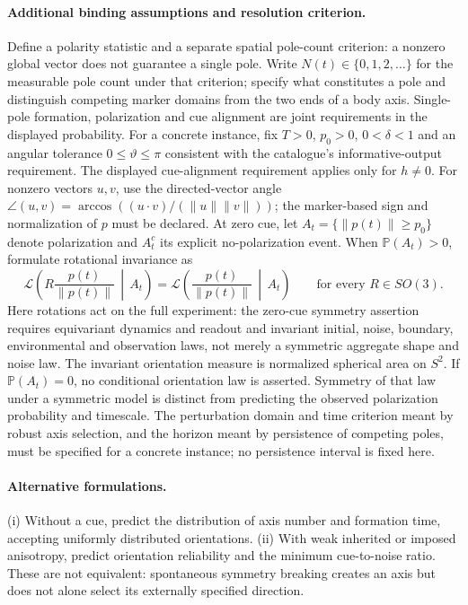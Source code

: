 \documentclass[11pt]{article}
\begin{document}
\paragraph{Additional binding assumptions and resolution criterion.} Define a polarity statistic and a separate spatial pole-count criterion: a nonzero global vector does not guarantee a single pole. Write $N(t)\in\{0,1,2,\ldots\}$ for the measurable pole count under that criterion; specify what constitutes a pole and distinguish competing marker domains from the two ends of a body axis. Single-pole formation, polarization and cue alignment are joint requirements in the displayed probability. For a concrete instance, fix $T>0$, $p_0>0$, $0<\delta<1$ and an angular tolerance $0\leq\vartheta\leq\pi$ consistent with the catalogue's informative-output requirement. The displayed cue-alignment requirement applies only for $h\ne0$. For nonzero vectors $u,v$, use the directed-vector angle $\angle(u,v)=\arccos((u\cdot v)/(\|u\|\|v\|))$; the marker-based sign and normalization of $p$ must be declared. At zero cue, let $A_t=\{\|p(t)\|\geq p_0\}$ denote polarization and $A_t^c$ its explicit no-polarization event. When $\mathbb{P}(A_t)>0$, formulate rotational invariance as
\[
\mathcal{L}\!\left(R\frac{p(t)}{\|p(t)\|}\,\middle|\,A_t\right)
=\mathcal{L}\!\left(\frac{p(t)}{\|p(t)\|}\,\middle|\,A_t\right)
\qquad\text{for every }R\in SO(3).
\]
Here rotations act on the full experiment: the zero-cue symmetry assertion requires equivariant dynamics and readout and invariant initial, noise, boundary, environmental and observation laws, not merely a symmetric aggregate shape and noise law. The invariant orientation measure is normalized spherical area on $S^2$. If $\mathbb{P}(A_t)=0$, no conditional orientation law is asserted. Symmetry of that law under a symmetric model is distinct from predicting the observed polarization probability and timescale. The perturbation domain and time criterion meant by robust axis selection, and the horizon meant by persistence of competing poles, must be specified for a concrete instance; no persistence interval is fixed here.

\paragraph{Alternative formulations.} (i) Without a cue, predict the distribution of axis number and formation time, accepting uniformly distributed orientations. (ii) With weak inherited or imposed anisotropy, predict orientation reliability and the minimum cue-to-noise ratio. These are not equivalent: spontaneous symmetry breaking creates an axis but does not alone select its externally specified direction.
\end{document}
